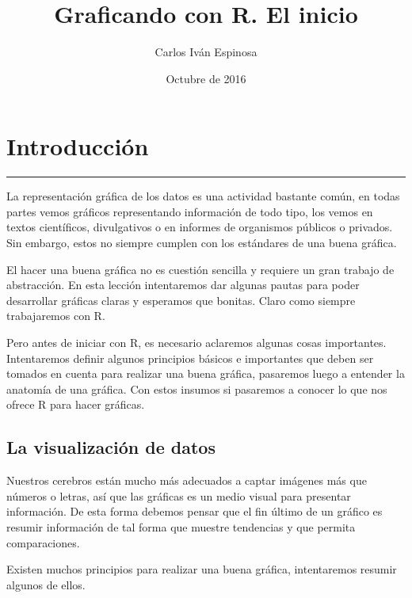 \documentclass[]{article}
\title{Graficando con R. El inicio}
\author{Carlos Iván Espinosa}
\date{Octubre de 2016}
\begin{document}
\maketitle

{
\setcounter{tocdepth}{2}
\tableofcontents
}
\section{Introducción}\label{introduccion}

\begin{center}\rule{0.5\linewidth}{\linethickness}\end{center}

La representación gráfica de los datos es una actividad bastante común,
en todas partes vemos gráficos representando información de todo tipo,
los vemos en textos científicos, divulgativos o en informes de
organismos públicos o privados. Sin embargo, estos no siempre cumplen
con los estándares de una buena gráfica.

El hacer una buena gráfica no es cuestión sencilla y requiere un gran
trabajo de abstracción. En esta lección intentaremos dar algunas pautas
para poder desarrollar gráficas claras y esperamos que bonitas. Claro
como siempre trabajaremos con R.

Pero antes de iniciar con R, es necesario aclaremos algunas cosas
importantes. Intentaremos definir algunos principios básicos e
importantes que deben ser tomados en cuenta para realizar una buena
gráfica, pasaremos luego a entender la anatomía de una gráfica. Con
estos insumos si pasaremos a conocer lo que nos ofrece R para hacer
gráficas.

\subsection{La visualización de datos}\label{la-visualizacion-de-datos}

Nuestros cerebros están mucho más adecuados a captar imágenes más que
números o letras, así que las gráficas es un medio visual para presentar
información. De esta forma debemos pensar que el fin último de un
gráfico es resumir información de tal forma que muestre tendencias y que
permita comparaciones.

Existen muchos principios para realizar una buena gráfica, intentaremos
resumir algunos de ellos.
\end{document}
